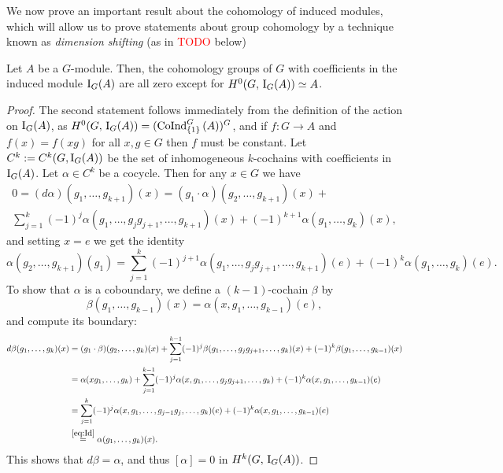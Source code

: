\documentclass[a4paper, oneside]{memoir}
\begin{document}
We now prove an important result about the cohomology of induced modules, which will allow us to prove statements about group cohomology by a technique known as \textit{dimension
shifting} (as in \textcolor{red}{TODO} below)

\begin{proposition}
    Let $A$ be a $G$-module. Then, the cohomology groups of $G$ with coefficients in the induced module $\mathrm{I}_{G}(A)$ are all zero except for $H^{0}( G, \, \mathrm{I}_{G}(A) )\simeq A$.
\end{proposition}

\begin{proof}
    The second statement follows immediately from the definition of the action on $\mathrm{I}_{G}(A)$, as $H^{0}( G, \, \mathrm{I}_{G}(A) )=(\operatorname{CoInd}^G_{\{1\}}{(A)})^G$, and if $f: G\to A$ and $f(x)=f(xg)$ for all $x, g\in G$ then $f$ must be constant.
    Let $C^k:=C^k(G,\mathrm{I}_{G}(A))$ be the set of inhomogeneous $k$-cochains with coefficients in $\mathrm{I}_{G}(A)$. Let $\alpha\in C^{k} $ be a cocycle. Then for any $x\in G$ we have
    \begin{align*}
        0 = (d\alpha)(g_1,\dots , g_{k+1})(x) = (g_1\cdot \alpha)(g_2,\dots , g_{k+1})(x) +\\
        \sum_{j=1}^{k} (-1)^j \alpha(g_1,\dots , g_j g_{j+1},\dots , g_{k+1})(x) + (-1)^{k+1} \alpha(g_1,\dots , g_k)(x),
    \end{align*}
    and setting $x=e$ we get the identity
    \begin{equation*}\label{eq:Id}
        \alpha(g_2, \dots , g_{k+1})(g_1) = \sum_{j=1}^{k} (-1)^{j+1} \alpha(g_1,\dots , g_j g_{j+1},\dots , g_{k+1})(e) + (-1)^k \alpha(g_1,\dots , g_k)(e).
    \end{equation*}
    To show that $\alpha$ is a coboundary, we define a $(k-1)$-cochain $\beta$ by
    \[
        \beta(g_1,\dots , g_{k-1})(x) = \alpha(x,g_1,\dots , g_{k-1})(e),
    \]
    and compute its boundary:
    \begin{align*}
        d\beta(g_1,\dots , g_k)(x) &= (g_1\cdot \beta)(g_2,\dots , g_k)(x) + \sum_{j=1}^{k-1} (-1)^j \beta(g_1,\dots , g_j g_{j+1},\dots , g_k)(x) + (-1)^k \beta(g_1,\dots , g_{k-1})(x) \\
                                 &= \alpha(x g_1,\dots , g_k) + \sum_{j=1}^{k-1} (-1)^j \alpha(x,g_1,\dots , g_j g_{j+1},\dots , g_k) + (-1)^k \alpha(x, g_1,\dots , g_{k-1})(e)  \\
                                 &= \sum_{j=1}^k (-1)^j \alpha(x,g_1,\dots , g_{j-1} g_j,\dots , g_k)(e) + (-1)^k \alpha(x,g_1,\dots , g_{k-1})(e)\\
                                 &\overset{\eqref{eq:Id}}{=} \alpha(g_1,\dots , g_k)(x)
    .\end{align*}
    This shows that $d\beta=\alpha$, and thus $[\alpha]=0$ in $H^{k}( G, \, \mathrm{I}_{G}(A) )$.
\end{proof}
\end{document}
